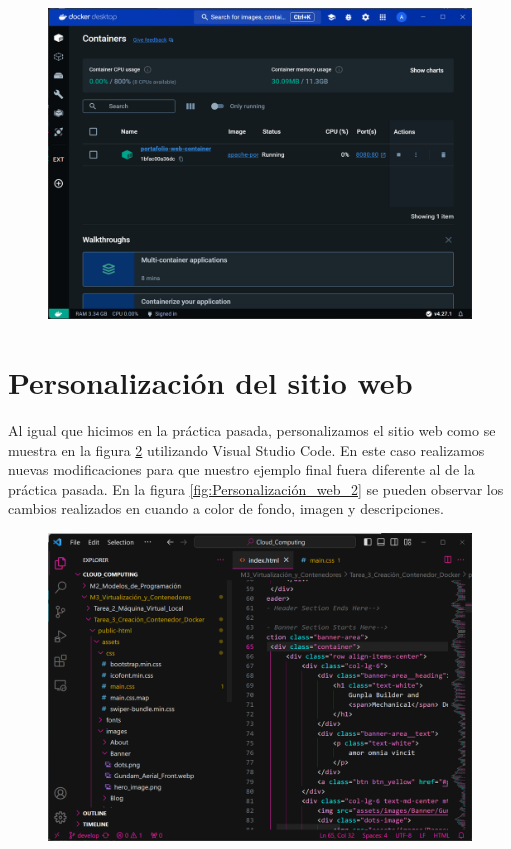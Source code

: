 \documentclass[12pt,a4paper]{article}
\begin{document}
\begin{figure}[H]
    \centering
    \includegraphics[width=1\linewidth]{M3_Virtualización_y_Contenedores/Tarea_3_Creación_Contenedor_Docker/reporte/figuras/4-2_Creación_del_Contenedor.png}
    \label{fig:Creación_Contenedor_2}
\end{figure}


\section{Personalización del sitio web}

Al igual que hicimos en la práctica pasada, personalizamos el sitio web como se muestra en la figura \ref{fig:Personalización_web_1} utilizando Visual Studio Code. En este caso realizamos nuevas modificaciones para que nuestro ejemplo final fuera diferente al de la práctica pasada. En la figura \ref{fig:Personalización_web_2} se pueden observar los cambios realizados en cuando a color de fondo, imagen y descripciones.

\begin{figure}[H]
    \centering
    \includegraphics[width=.75\linewidth]{M3_Virtualización_y_Contenedores/Tarea_3_Creación_Contenedor_Docker/reporte/figuras/5-1_Personalización_Sitio_Web.png}
    \label{fig:Personalización_web_1}
\end{figure}
\end{document}
